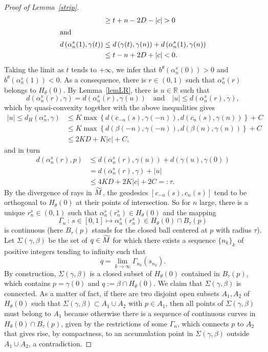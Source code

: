 \documentclass[AHL,Unicode,longabstracts,published]{cedram}
\newcommand{\bbR}{\mathbb{R}}
\let\oldtilde\tilde
\renewcommand*{\tilde}[1]{\mathchoice{\widetilde{#1}}{\widetilde{#1}}{\oldtilde{#1}}{\oldtilde{#1}}}
\begin{document}
\begin{proof}[Proof of Lemma~\ref{strip}]
\begin{align*}
& \geq t+n -2 D -|c| >0
\\
\intertext{and}
d\left(\alpha_n^s(1),\gamma(t)\right) & \leq d\left(\gamma(t),\gamma(n)\right)+d\left(\alpha_n^s(1),\gamma(n)\right) \\
& \leq t-n +2 D +|c| <0.
\end{align*}
Taking the limit as $t$ tends to $+\infty$, we infer that $b^{\theta}(\alpha_n^s(0))>0$ and $b^{\theta}(\alpha_n^s(1))<0$. As a consequence, there is $r\in (0,1)$ such that $\alpha_n^s(r)$ belongs to $H_{\theta}(0)$. By Lemma~\ref{lemLR}, there is $u\in \bbR$ such that
\[
d \left(\alpha_n^s(r),\gamma\right) = d \left(\alpha_n^s(r),\gamma(u) \right) \quad \text{and} \quad |u| \leq d \left(\alpha_n^s(r),\gamma\right),
\]
which by quasi-convexity together with the above inequalities gives
\begin{align*}
|u| \leq d_{H}\left(\alpha_n^s, \gamma\right) & \leq K\max \left\{ d\left(c_{-n}(s),\gamma(-n)\right), d\left(c_n(s),\gamma(n)\right)\right\} + C\\
& \leq K\max \left\{ d\left(\beta(-n),\gamma(-n)\right), d\left(\beta(n),\gamma(n)\right)\right\} + C \\
& \leq 2KD + K|c| +C,
\end{align*}
and in turn
\begin{align*}
d \left(\alpha_n^s(r),p \right) & \leq d \left(\alpha_n^s(r),\gamma(u)\right) + d\left(\gamma(u),\gamma(0)\right) \\
& = d \left(\alpha_n^s(r),\gamma\right) + |u| \\
& \leq 4KD + 2K|c| +2C =:\tau.
\end{align*}
By the divergence of rays in $\tilde{M}$, the geodesics $[c_{-n}(s), c_{n}(s)]$ tend to be orthogonal to $H_{\theta}(0)$ at their points of intersection. So for $n$ large, there is a unique $r_{n}^s \in (0,1)$ such that $\alpha_n^s(r_n^s) \in H_{\theta}(0)$ and the mapping
\[
\Gamma_n \, : \, s \in [0,1] \longmapsto \alpha_n^s(r_n^s) \in H_{\theta}(0) \cap B_{\tau}(p)
\]
is continuous (here $B_{\tau}(p)$ stands for the closed ball centered at $p$ with radius $\tau$). Let $\Sigma(\gamma, \beta)$ be the set of $q\in \tilde{M}$ for which there exists a sequence $\{n_k\}_k$ of positive integers tending to infinity such that
\[
q = \lim_{k\rightarrow \infty} \Gamma_{n_k}\left(s_{n_k}\right).
\]
By construction, $\Sigma(\gamma, \beta)$ is a closed subset of $H_{\theta}(0)$ contained in $B_{\tau}(p)$, which contains $p=\gamma(0)$ and $q :=\beta \cap H_{\theta}(0)$. We claim that $\Sigma(\gamma, \beta)$ is connected. As a matter of fact, if there are two disjoint open subsets $A_1, A_2$ of $H_{\theta}(0)$ such that $\Sigma(\gamma, \beta)\subset A_1 \cup A_2$ with $p\in A_1$, then all points of $\Sigma(\gamma,\beta)$ must belong to $A_1$ because otherwise there is a sequence of continuous curves in $H_{\theta}(0)\cap B_{\tau}(p)$, given by the restrictions of some $\Gamma_n$, which connects $p$ to $A_2$ that gives rise, by compactness, to an accumulation point in $\Sigma(\gamma,\beta)$ outside $A_1\cup A_2$, a contradiction.


\end{proof}
\end{document}
